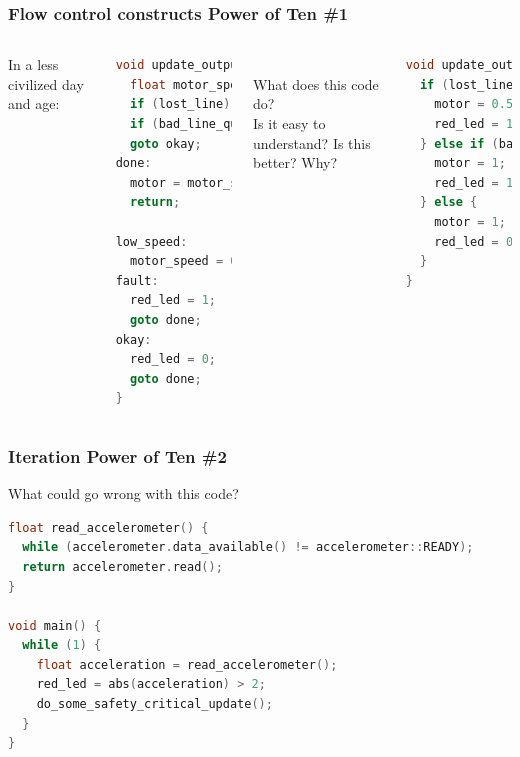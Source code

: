 \documentclass{beamer}
\begin{document}
\begin{frame}[fragile]
\frametitle{Flow control constructs \small{Power of Ten \#1}}
\begin{columns}[t]
In a less civilized day and age: \\
\begin{lstlisting}[language=C++,basicstyle=\ttfamily\tiny]
void update_outputs() {
  float motor_speed = 1;
  if (lost_line) goto low_speed;
  if (bad_line_quality) goto fault;
  goto okay;
done:
  motor = motor_speed;
  return;
  
low_speed:
  motor_speed = 0.5;
fault:
  red_led = 1;
  goto done;
okay:
  red_led = 0;
  goto done;
}
\end{lstlisting}
\hfill \\
What does this code do? \\
Is it easy to understand?
Is this better? Why?
\begin{lstlisting}[language=C++,basicstyle=\ttfamily\tiny]
void update_outputs() {
  if (lost_line) {
    motor = 0.5;
    red_led = 1;
  } else if (bad_line_quality) {
    motor = 1;
    red_led = 1;
  } else {
    motor = 1;
    red_led = 0;
  }
}
\end{lstlisting}
\end{columns}
\end{frame}


\begin{frame} [fragile]
\frametitle{Iteration \small{Power of Ten \#2}}
What could go wrong with this code?
\begin{lstlisting}[language=C++,basicstyle=\ttfamily\tiny]
float read_accelerometer() {
  while (accelerometer.data_available() != accelerometer::READY);
  return accelerometer.read();
}

void main() {
  while (1) {
    float acceleration = read_accelerometer();
    red_led = abs(acceleration) > 2;
    do_some_safety_critical_update();
  }
}
\end{lstlisting}
\hfill \\
\end{frame}
\end{document}
